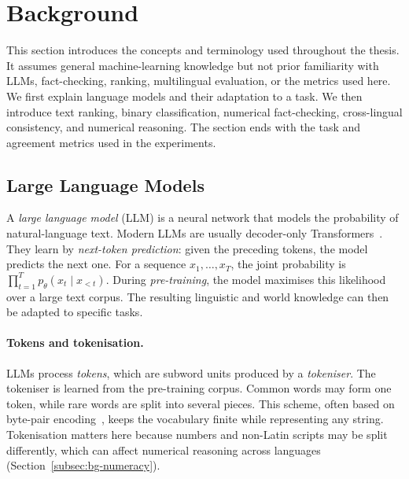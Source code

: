 
\section{Background}
\label{sec:background}

This section introduces the concepts and terminology used throughout the thesis. It assumes general
machine-learning knowledge but not prior familiarity with LLMs, fact-checking, ranking, multilingual
evaluation, or the metrics used here. We first explain language models and their adaptation to a task.
We then introduce text ranking, binary classification, numerical fact-checking, cross-lingual
consistency, and numerical reasoning. The section ends with the task and agreement metrics used in
the experiments.

\subsection{Large Language Models}
\label{subsec:bg-llm}

A \emph{large language model} (LLM) is a neural network that models the probability of natural-language
text. Modern LLMs are usually decoder-only Transformers~\cite{vaswani2017attention}. They learn by
\emph{next-token prediction}: given the preceding tokens, the model predicts the next one. For a
sequence $x_1,\dots,x_T$, the joint probability is
$\prod_{t=1}^{T} p_\theta(x_t \mid x_{<t})$. During \emph{pre-training}, the model maximises this
likelihood over a large text corpus. The resulting linguistic and world knowledge can then be adapted
to specific tasks.

\paragraph{Tokens and tokenisation.}
LLMs process \emph{tokens}, which are subword units produced by a \emph{tokeniser}. The tokeniser is
learned from the pre-training corpus. Common words may form one token, while rare words are split into
several pieces. This scheme, often based on byte-pair encoding~\cite{sennrich2016bpe}, keeps the
vocabulary finite while representing any string. Tokenisation matters here because numbers and
non-Latin scripts may be split differently, which can affect numerical reasoning across languages
(Section~\ref{subsec:bg-numeracy}).

